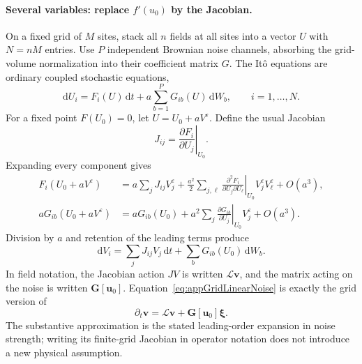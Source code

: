 \documentclass{article}
\begin{document}
\paragraph{Several variables: replace $f'(u_0)$ by the Jacobian.}
On a fixed grid of $M$ sites, stack all $n$ fields at all sites into a vector $U$ with $N=nM$ entries. Use $P$ independent Brownian noise channels, absorbing the grid-volume normalization into their coefficient matrix $G$. The It\^{o} equations are ordinary coupled stochastic equations,
\begin{equation}
    \mathrm dU_i=F_i(U)\,\mathrm dt
    +a\sum_{b=1}^{P}G_{ib}(U)\,\mathrm dW_b,\qquad i=1,\ldots,N.
\end{equation}
For a fixed point $F(U_0)=0$, let $U=U_0+a V^\varepsilon$. Define the usual Jacobian
\begin{equation}
    J_{ij}=\left.\frac{\partial F_i}{\partial U_j}\right|_{U_0}.
\end{equation}
Expanding every component gives
\begin{align}
    F_i(U_0+aV^\varepsilon)
    &=a\sum_jJ_{ij}V_j^\varepsilon
    +\frac{a^2}{2}\sum_{j,\ell}
    \left.\frac{\partial^2F_i}{\partial U_j\partial U_\ell}\right|_{U_0}
    V_j^\varepsilon V_\ell^\varepsilon+O(a^3),\\
    aG_{ib}(U_0+aV^\varepsilon)
    &=aG_{ib}(U_0)+a^2\sum_j
    \left.\frac{\partial G_{ib}}{\partial U_j}\right|_{U_0}V_j^\varepsilon+O(a^3).
\end{align}
Division by $a$ and retention of the leading terms produce
\begin{equation}
    \mathrm dV_i=\sum_jJ_{ij}V_j\,\mathrm dt
    +\sum_bG_{ib}(U_0)\,\mathrm dW_b.
    \label{eq:appGridLinearNoise}
\end{equation}
In field notation, the Jacobian action $JV$ is written $\mathcal L\mathbf v$, and the matrix acting on the noise is written $\mathbf G[\mathbf u_0]$. Equation~\eqref{eq:appGridLinearNoise} is exactly the grid version of
\begin{equation}
    \boxed{\partial_t\mathbf v=\mathcal L\mathbf v+\mathbf G[\mathbf u_0]\boldsymbol\xi.}
\end{equation}
The substantive approximation is the stated leading-order expansion in noise strength; writing its finite-grid Jacobian in operator notation does not introduce a new physical assumption.
\end{document}
